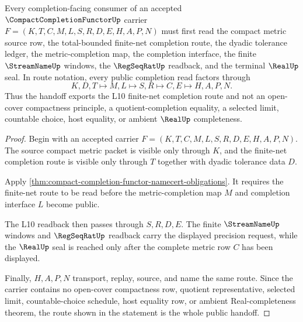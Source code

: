 \begin{theorem}
\label{thm:compact-completion-functor-finite-net-handoff}
Every completion-facing consumer of an accepted $\CompactCompletionFunctorUp$ carrier $F=(K,T,C,M,L,S,R,D,E,H,A,P,N)$ must first read the compact metric source row, the total-bounded finite-net completion route, the dyadic tolerance ledger, the metric-completion map, the completion interface, the finite $\StreamNameUp$ windows, the $\RegSeqRatUp$ readback, and the terminal $\RealUp$ seal. In route notation, every public completion read factors through
$$
K,D,T \longmapsto M,L \longmapsto S,R \longmapsto C,E \longmapsto H,A,P,N .
$$
Thus the handoff exports the L10 finite-net completion route and not an open-cover compactness principle, a quotient-completion equality, a selected limit, countable choice, host equality, or ambient $\RealUp$ completeness.
\end{theorem}
\begin{proof}
Begin with an accepted carrier $F=(K,T,C,M,L,S,R,D,E,H,A,P,N)$. The source compact metric packet is visible only through $K$, and the finite-net completion route is visible only through $T$ together with dyadic tolerance data $D$.

Apply \autoref{thm:compact-completion-functor-namecert-obligations}. It requires the finite-net route to be read before the metric-completion map $M$ and completion interface $L$ become public.

The L10 readback then passes through $S,R,D,E$. The finite $\StreamNameUp$ windows and $\RegSeqRatUp$ readback carry the displayed precision request, while the $\RealUp$ seal is reached only after the complete metric row $C$ has been displayed.

Finally, $H,A,P,N$ transport, replay, source, and name the same route. Since the carrier contains no open-cover compactness row, quotient representative, selected limit, countable-choice schedule, host equality row, or ambient Real-completeness theorem, the route shown in the statement is the whole public handoff.
\end{proof}



